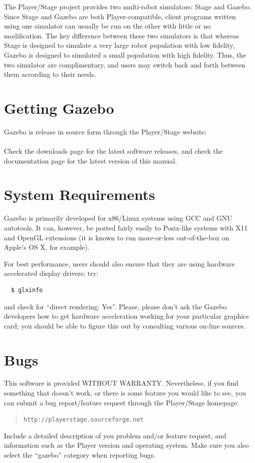 \documentclass[11pt]{report}
\def\HOMEPAGE {{\tt http://playerstage.sourceforge.net}}
\begin{document}
The Player/Stage project provides two multi-robot simulators: Stage
and Gazebo.  Since Stage and Gazebo are both Player-compatible, client
programs written using one simulator can usually be run on the other
with little or no modification.  The key difference between these two
simulators is that whereas Stage is designed to simulate a very large
robot population with low fidelity, Gazebo is designed to simulated a
small population with high fidelity.  Thus, the two simulator are
complimentary, and users may switch back and forth between them
according to their needs.


\section{Getting Gazebo}

Gazebo is release in source form through the Player/Stage website:
\\\indent \HOMEPAGE\\
Check the downloads page for the latest software releases, and check
the documentation page for the latest version of this manual.


\section{System Requirements}

Gazebo is primarily developed for x86/Linux systems using GCC and GNU
autotools.  It can, however, be ported fairly easily to Posix-like
systems with X11 and OpenGL extensions (it is known to run
more-or-less out-of-the-box on Apple's OS X, for example).

For best performance, users should also ensure that they are using
hardware accelerated display drivers; try:
  \begin{verbatim}
  $ glxinfo \end{verbatim} %
and check for ``direct rendering: Yes''.  Please, please don't ask the
Gazebo developers how to get hardware acceleration working for your
particular graphics card; you should be able to figure this out by
consulting various on-line sources.


\section{Bugs}

This software is provided WITHOUT WARRANTY.  Nevertheless, if you find
something that doesn't work, or there is some feature you would like
to see, you can submit a bug report/feature request through the
Player/Stage homepage:
\begin{quote} 
\HOMEPAGE
\end{quote}
Include a detailed description of you problem and/or feature request,
and information such as the Player version and operating system.  Make
sure you also select the ``gazebo'' category when reporting bugs.
\end{document}
